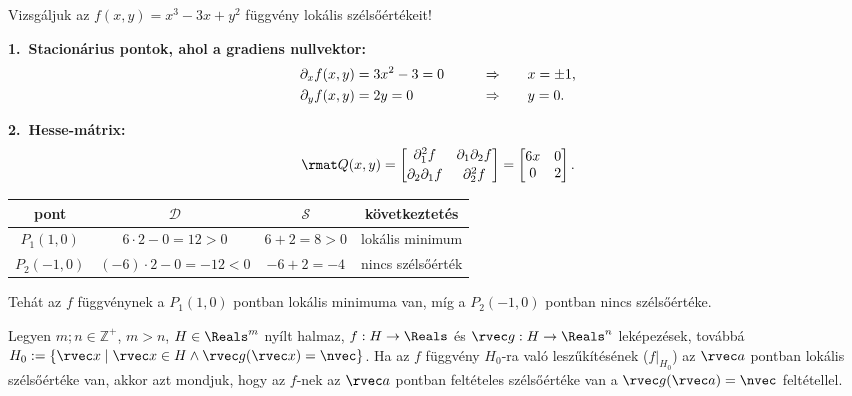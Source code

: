 \begin{example}
  Vizsgáljuk az $f(x,y)=x^{3}-3x+y^{2}$ függvény lokális szélsőértékeit!

  \hdashrule[.8ex][x]{\dimexpr\textwidth}{1pt}{2mm 3pt}

  \textbf{1.~Stacionárius pontok, ahol a gradiens nullvektor:}
  \begin{alignat*}{9}
    \partial_x f(x,y) & = 3x^{2}-3 = 0
    \qquad            & \Rightarrow \qquad & x=\pm 1
    \text,
    \\
    \partial_y f(x,y) & = 2y = 0
    \qquad            & \Rightarrow \qquad & y = 0
    \text.
  \end{alignat*}

  \textbf{2.~Hesse-mátrix:}
  \[
    \rmat Q(x,y)=
    \begin{bmatrix}
      \partial_{1}^{2}f         & \partial_{1}\partial_{2}f \\[2pt]
      \partial_{2}\partial_{1}f & \partial_{2}^{2}f
    \end{bmatrix}
    =
    \begin{bmatrix}
      6x & 0 \\
      0  & 2
    \end{bmatrix}.
  \]

  \begin{center}
    \def\arraystretch{1.3}
    \begin{tabular}{c|c|c|c}
      pont        & $\mathscr D$         & $\mathscr S$ & következtetés     \\\hline
      $P_1(1,0)$  & $6\cdot2-0=12>0$     & $6+2=8>0$    & lokális minimum   \\
      $P_2(-1,0)$ & $(-6)\cdot2-0=-12<0$ & $-6+2=-4$    & nincs szélsőérték
    \end{tabular}
  \end{center}

  \medskip
  Tehát az $f$ függvénynek a $P_1(1,0)$ pontban lokális minimuma van, míg a
  $P_2(-1,0)$ pontban nincs szélsőértéke.
\end{example}

\begin{definition}
  Legyen $m;n \in \mathbb Z^+$, $m > n$, $H \in \Reals^m$ nyílt halmaz,
  $f: H \to \Reals$ és $\rvec g : H \to \Reals^n$ leképezések, továbbá
  $H_0 := \{ \rvec x \mid \rvec x \in H \land \rvec g (\rvec x) = \nvec\}$.
  Ha az $f$ függvény $H_0$-ra való leszűkítésének ($f|_{H_0}$) az
  $\rvec a$ pontban lokális szélsőértéke van, akkor azt mondjuk, hogy az $f$-nek
  az $\rvec a$ pontban feltételes szélsőértéke van a $\rvec g(\rvec a) = \nvec$
  feltétellel.
\end{definition}

